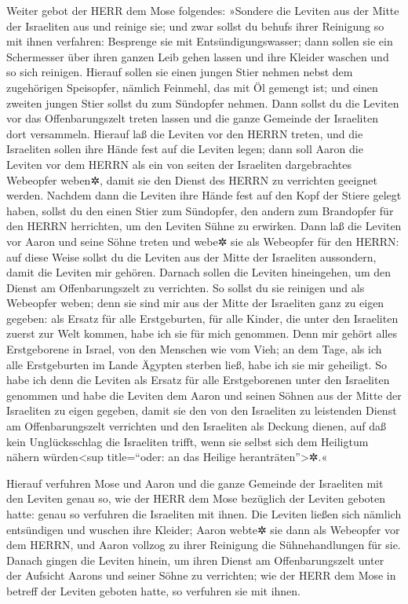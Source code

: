 Weiter gebot der HERR dem Mose folgendes:
»Sondere die Leviten aus der Mitte der Israeliten aus und
reinige sie; und zwar sollst du behufs ihrer Reinigung so
mit ihnen verfahren: Besprenge sie mit Entsündigungswasser; dann sollen
sie ein Schermesser über ihren ganzen Leib gehen lassen und ihre Kleider
waschen und so sich reinigen. Hierauf sollen sie einen
jungen Stier nehmen nebst dem zugehörigen Speisopfer, nämlich Feinmehl,
das mit Öl gemengt ist; und einen zweiten jungen Stier sollst du zum
Sündopfer nehmen. Dann sollst du die Leviten vor das
Offenbarungszelt treten lassen und die ganze Gemeinde der Israeliten
dort versammeln. Hierauf laß die Leviten vor den HERRN
treten, und die Israeliten sollen ihre Hände fest auf die Leviten legen;
dann soll Aaron die Leviten vor dem HERRN als ein von
seiten der Israeliten dargebrachtes Webeopfer weben✲, damit sie den
Dienst des HERRN zu verrichten geeignet werden. Nachdem
dann die Leviten ihre Hände fest auf den Kopf der Stiere gelegt haben,
sollst du den einen Stier zum Sündopfer, den andern zum Brandopfer für
den HERRN herrichten, um den Leviten Sühne zu erwirken.
Dann laß die Leviten vor Aaron und seine Söhne treten und
webe✲ sie als Webeopfer für den HERRN: auf diese Weise
sollst du die Leviten aus der Mitte der Israeliten aussondern, damit die
Leviten mir gehören. Darnach sollen die Leviten
hineingehen, um den Dienst am Offenbarungszelt zu verrichten. So sollst
du sie reinigen und als Webeopfer weben; denn sie sind
mir aus der Mitte der Israeliten ganz zu eigen gegeben: als Ersatz für
alle Erstgeburten, für alle Kinder, die unter den Israeliten zuerst zur
Welt kommen, habe ich sie für mich genommen. Denn mir
gehört alles Erstgeborene in Israel, von den Menschen wie vom Vieh; an
dem Tage, als ich alle Erstgeburten im Lande Ägypten sterben ließ, habe
ich sie mir geheiligt. So habe ich denn die Leviten als
Ersatz für alle Erstgeborenen unter den Israeliten genommen
und habe die Leviten dem Aaron und seinen Söhnen aus der
Mitte der Israeliten zu eigen gegeben, damit sie den von den Israeliten
zu leistenden Dienst am Offenbarungszelt verrichten und den Israeliten
als Deckung dienen, auf daß kein Unglücksschlag die Israeliten trifft,
wenn sie selbst sich dem Heiligtum nähern würden\textless sup
title=``oder: an das Heilige heranträten''\textgreater✲.«

Hierauf verfuhren Mose und Aaron und die ganze Gemeinde
der Israeliten mit den Leviten genau so, wie der HERR dem Mose bezüglich
der Leviten geboten hatte: genau so verfuhren die Israeliten mit ihnen.
Die Leviten ließen sich nämlich entsündigen und wuschen
ihre Kleider; Aaron webte✲ sie dann als Webeopfer vor dem HERRN, und
Aaron vollzog zu ihrer Reinigung die Sühnehandlungen für sie.
Danach gingen die Leviten hinein, um ihren Dienst am
Offenbarungszelt unter der Aufsicht Aarons und seiner Söhne zu
verrichten; wie der HERR dem Mose in betreff der Leviten geboten hatte,
so verfuhren sie mit ihnen.

